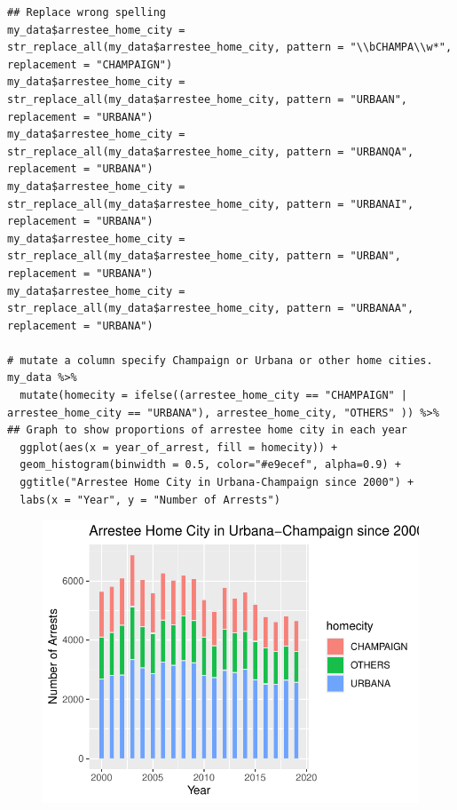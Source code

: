 \documentclass[
  article]{jss}
\begin{document}
\begin{verbatim}
## Replace wrong spelling
my_data$arrestee_home_city = str_replace_all(my_data$arrestee_home_city, pattern = "\\bCHAMPA\\w*", replacement = "CHAMPAIGN")
my_data$arrestee_home_city = str_replace_all(my_data$arrestee_home_city, pattern = "URBAAN", replacement = "URBANA")
my_data$arrestee_home_city = str_replace_all(my_data$arrestee_home_city, pattern = "URBANQA", replacement = "URBANA")
my_data$arrestee_home_city = str_replace_all(my_data$arrestee_home_city, pattern = "URBANAI", replacement = "URBANA")
my_data$arrestee_home_city = str_replace_all(my_data$arrestee_home_city, pattern = "URBAN", replacement = "URBANA")
my_data$arrestee_home_city = str_replace_all(my_data$arrestee_home_city, pattern = "URBANAA", replacement = "URBANA")

# mutate a column specify Champaign or Urbana or other home cities.
my_data %>% 
  mutate(homecity = ifelse((arrestee_home_city == "CHAMPAIGN" | arrestee_home_city == "URBANA"), arrestee_home_city, "OTHERS" )) %>% 
## Graph to show proportions of arrestee home city in each year
  ggplot(aes(x = year_of_arrest, fill = homecity)) +
  geom_histogram(binwidth = 0.5, color="#e9ecef", alpha=0.9) +
  ggtitle("Arrestee Home City in Urbana-Champaign since 2000") +
  labs(x = "Year", y = "Number of Arrests")
\end{verbatim}

\begin{figure}[H]

{\centering \includegraphics{progress-report_files/figure-pdf/unnamed-chunk-8-1.pdf}

}

\end{figure}
\end{document}
